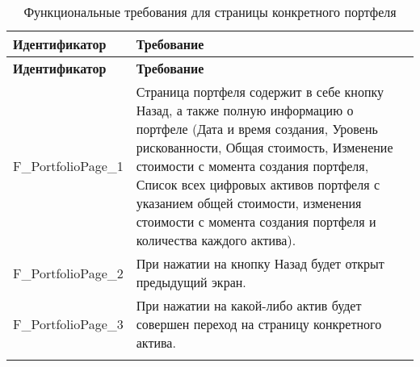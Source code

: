 \documentclass[a4paper, 14pt]{article}
\begin{document}
\begin{longtable}{| p{} | p{} |}
    \hline
    \textbf{Идентификатор}          & \textbf{Требование}                                                                                                                                                                \\
    \hline
    \endfirsthead
    \hline
    \textbf{Идентификатор}          & \textbf{Требование}                                                                                                                                                                \\
    \hline
    \endhead

    F\_PortfolioPage\_1       & Страница портфеля содержит в себе кнопку Назад, а также полную информацию о портфеле (Дата и время создания, Уровень рискованности, Общая стоимость, Изменение стоимости с момента создания портфеля, Список всех цифровых активов портфеля с указанием общей стоимости, изменения стоимости с момента создания портфеля и количества каждого актива).      \\ \hline
    F\_PortfolioPage\_2       & При нажатии на кнопку Назад будет открыт предыдущий экран.                                                                                                                         \\ \hline
    F\_PortfolioPage\_3       & При нажатии на какой-либо актив будет совершен переход на страницу конкретного актива.                                                                                             \\ \hline

    \caption{Функциональные требования для страницы конкретного портфеля}
\end{longtable}
\end{document}
